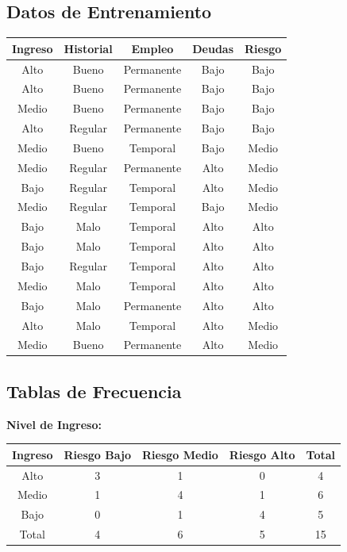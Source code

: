 \documentclass[12pt]{article}
\begin{document}
\subsection{Datos de Entrenamiento}
\begin{table}[H]
    \centering
    \small
    \begin{tabular}{ccccc}
        \toprule
        Ingreso & Historial & Empleo & Deudas & Riesgo \\
        \midrule
        Alto & Bueno & Permanente & Bajo & Bajo \\
        Alto & Bueno & Permanente & Bajo & Bajo \\
        Medio & Bueno & Permanente & Bajo & Bajo \\
        Alto & Regular & Permanente & Bajo & Bajo \\
        Medio & Bueno & Temporal & Bajo & Medio \\
        Medio & Regular & Permanente & Alto & Medio \\
        Bajo & Regular & Temporal & Alto & Medio \\
        Medio & Regular & Temporal & Bajo & Medio \\
        Bajo & Malo & Temporal & Alto & Alto \\
        Bajo & Malo & Temporal & Alto & Alto \\
        Bajo & Regular & Temporal & Alto & Alto \\
        Medio & Malo & Temporal & Alto & Alto \\
        Bajo & Malo & Permanente & Alto & Alto \\
        Alto & Malo & Temporal & Alto & Medio \\
        Medio & Bueno & Permanente & Alto & Medio \\
        \bottomrule
    \end{tabular}
\end{table}

\subsection{Tablas de Frecuencia}

\textbf{Nivel de Ingreso:}
\begin{table}[H]
    \centering
    \begin{tabular}{ccccc}
        \toprule
        Ingreso & Riesgo Bajo & Riesgo Medio & Riesgo Alto & Total \\
        \midrule
        Alto & 3 & 1 & 0 & 4 \\
        Medio & 1 & 4 & 1 & 6 \\
        Bajo & 0 & 1 & 4 & 5 \\
        \midrule
        Total & 4 & 6 & 5 & 15 \\
        \bottomrule
    \end{tabular}
\end{table}
\end{document}
